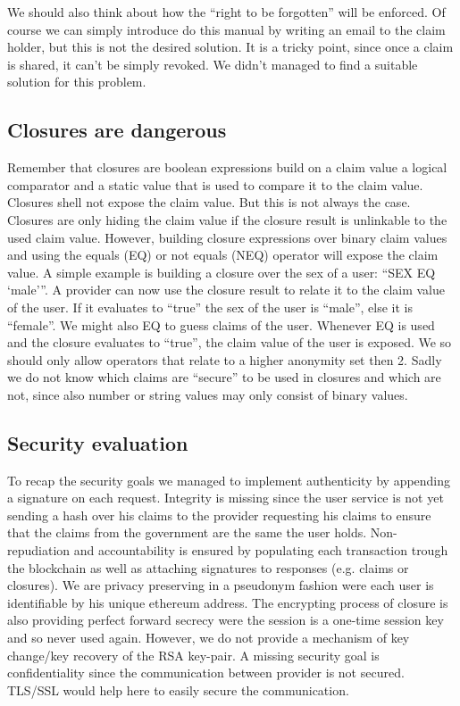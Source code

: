 We should also think about how the “right to be forgotten” will be enforced. Of course we can simply introduce do this manual by writing an email to the claim holder, but this is not the desired solution. It is a tricky point, since once a claim is shared, it can’t be simply revoked. We didn’t managed to find a suitable solution for this problem.  

\subsection{Closures are dangerous}
Remember that closures are boolean expressions build on a claim value a logical comparator and a static value that is used to compare it to the claim value. Closures shell not expose the claim value. But this is not always the case. Closures are only hiding the claim value if the closure result is unlinkable to the used claim value. However, building closure expressions over binary claim values and using the equals (EQ) or not equals (NEQ) operator will expose the claim value. A simple example is building a closure over the sex of a user: “SEX EQ ‘male’”. A provider can now use the closure result to relate it to the claim value of the user. If it evaluates to “true” the sex of the user is “male”, else it is “female”. We might also EQ to guess claims of the user. Whenever EQ is used and the closure evaluates to “true”, the claim value of the user is exposed. We so should only allow operators that relate to a higher anonymity set then 2. Sadly we do not know which claims are “secure” to be used in closures and which are not, since also number or string values may only consist of binary values. 

\subsection{Security evaluation}
To recap the security goals we managed to implement authenticity by appending a signature on each request. Integrity is missing since the user service is not yet sending a hash over his claims to the provider requesting his claims to ensure that the claims from the government are the same the user holds. Non-repudiation and accountability is ensured by populating each transaction trough the blockchain as well as attaching signatures to responses (e.g. claims or closures). We are privacy preserving in a pseudonym fashion were each user is identifiable by his unique ethereum address. The encrypting process of closure is also providing perfect forward secrecy were the session is a one-time session key and so never used again. However, we do not provide a mechanism of key change/key recovery of the RSA key-pair. A missing security goal is confidentiality since the communication between provider is not secured. TLS/SSL would help here to easily secure the communication. 

